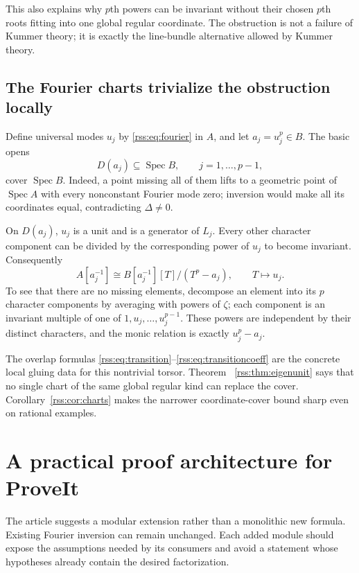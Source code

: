 \documentclass[11pt,a4paper]{article}
\theoremstyle{definition}
\theoremstyle{remark}
\newcommand{\Spec}{\operatorname{Spec}}
\begin{document}
This also explains why $p$th powers can be invariant without their chosen
$p$th roots fitting into one global regular coordinate. The obstruction is
not a failure of Kummer theory; it is exactly the line-bundle alternative
allowed by Kummer theory.

\subsection{The Fourier charts trivialize the obstruction locally}

Define universal modes $u_j$ by \eqref{rss:eq:fourier} in $A$, and let
$a_j=u_j^p\in B$. The basic opens
\[
 D(a_j)\subseteq\Spec B,\qquad j=1,\ldots,p-1,
\]
cover $\Spec B$. Indeed, a point missing all of them lifts to a geometric
point of $\Spec A$ with every nonconstant Fourier mode zero; inversion
would make all its coordinates equal, contradicting $\Delta\neq0$.

On $D(a_j)$, $u_j$ is a unit and is a generator of $L_j$. Every other
character component can be divided by the corresponding power of $u_j$
to become invariant. Consequently
\begin{equation}
 A[a_j^{-1}]\cong
 B[a_j^{-1}][T]/(T^p-a_j),\qquad T\longmapsto u_j.
 \label{rss:eq:localKummer}
\end{equation}
To see that there are no missing elements, decompose an element into its
$p$ character components by averaging with powers of $\zeta$; each
component is an invariant multiple of one of $1,u_j,\ldots,u_j^{p-1}$.
These powers are independent by their distinct characters, and the monic
relation is exactly $u_j^p-a_j$.

The overlap formulas \eqref{rss:eq:transition}--\eqref{rss:eq:transitioncoeff}
are the concrete local gluing data for this nontrivial torsor. Theorem~
\ref{rss:thm:eigenunit} says that no single chart of the same global regular
kind can replace the cover. Corollary~\ref{rss:cor:charts} makes the narrower
coordinate-cover bound sharp even on rational examples.

\section{A practical proof architecture for ProveIt}
\label{rss:sec:formalization}

The article suggests a modular extension rather than a monolithic new
formula. Existing Fourier inversion can remain unchanged. Each added
module should expose the assumptions needed by its consumers and avoid a
statement whose hypotheses already contain the desired factorization.
\end{document}
